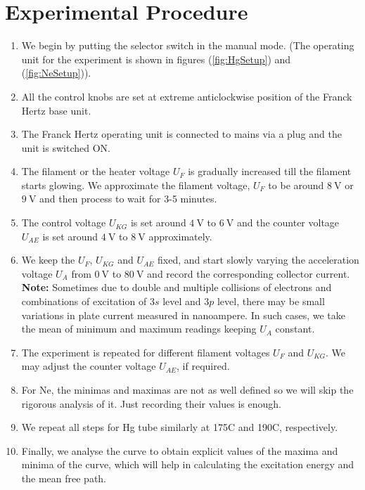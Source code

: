 \documentclass[%
 reprint,
 amsmath,amssymb,
 aps,
]{revtex4-2}
\begin{document}
\section{Experimental Procedure}
    \begin{enumerate}
        \item We begin by putting the selector switch in the manual mode. (The operating unit for the experiment is shown in figures (\ref{fig:HgSetup}) and (\ref{fig:NeSetup})).
        \item All the control knobs are set at extreme anticlockwise position of the Franck Hertz base unit.
        \item The Franck Hertz operating unit is connected to mains via a plug and the unit is switched ON.
        \item The filament or the heater voltage $U_F$ is gradually increased till the filament starts glowing. We approximate the filament voltage, $U_F$ to be around $\SI{8}{\volt}$ or $\SI{9}{\volt}$ and then process to wait for 3-5 minutes.
        \item The control voltage $U_{KG}$ is set around $\SI{4}{\volt}$ to $\SI{6}{\volt}$ and the counter voltage $U_{AE}$ is set around $\SI{4}{\volt}$ to $\SI{8}{\volt}$ approximately.
        \item We keep the $U_F$, $U_{KG}$ and $U_{AE}$ fixed, and start slowly varying the acceleration voltage $U_A$ from $\SI{0}{\volt}$ to $\SI{80}{\volt}$ and record the corresponding collector current.\\
        \textbf{Note: } Sometimes due to double and multiple collisions of electrons and combinations of excitation of 3$s$ level and 3$p$ level, there may be small variations in plate current measured in nanoampere. In such cases, we take the mean of minimum and maximum readings keeping $U_A$ constant.
        \item The experiment is repeated for different filament voltages $U_F$ and $U_{KG}$. We may adjust the counter voltage $U_{AE}$, if required.
        \item For Ne, the minimas and maximas are not as well defined so we will skip the rigorous analysis of it. Just recording their values is enough.
        \item We repeat all steps for Hg tube similarly at 175\degree C and 190\degree C, respectively.
        \item Finally, we analyse the curve to obtain explicit values of the maxima and minima of the curve, which will help in calculating the excitation energy and the mean free path.

\end{enumerate}
\end{document}
